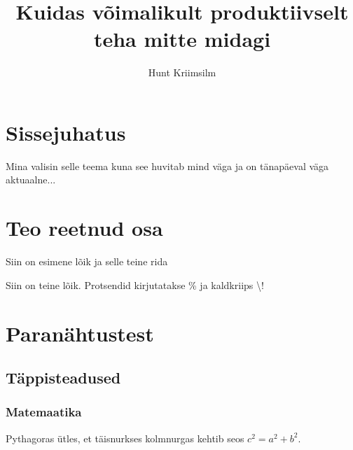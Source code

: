 \documentclass{trkuur} %
\title{Kuidas võimalikult produktiivselt \\ teha mitte midagi} %
\author{Hunt Kriimsilm}
\begin{document}
\maketitle
\tableofcontents

\chapter*{Sissejuhatus}
Mina valisin selle teema kuna see huvitab mind väga ja on tänapäeval väga aktuaalne...

\chapter{Teo reetnud osa}

Siin on esimene lõik
ja selle teine rida

Siin on teine lõik.
Protsendid kirjutatakse \% ja kaldkriips \textbackslash!

\chapter{Paranähtustest}
\section{Täppisteadused}
\subsection{Matemaatika}

Pythagoras ütles, et täisnurkses kolmnurgas kehtib seos $c^2 = a^2 + b^2$.
\end{document}

